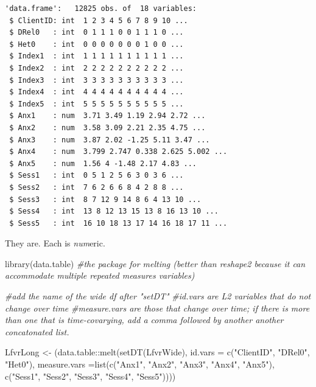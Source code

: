 \documentclass[
  11pt,
]{book}
\newenvironment{Shaded}{\begin{snugshade}}{\end{snugshade}}
\newcommand{\AttributeTok}[1]{\textcolor[rgb]{0.77,0.63,0.00}{#1}}
\newcommand{\CommentTok}[1]{\textcolor[rgb]{0.56,0.35,0.01}{\textit{#1}}}
\newcommand{\FunctionTok}[1]{\textcolor[rgb]{0.00,0.00,0.00}{#1}}
\newcommand{\NormalTok}[1]{#1}
\newcommand{\OtherTok}[1]{\textcolor[rgb]{0.56,0.35,0.01}{#1}}
\newcommand{\SpecialCharTok}[1]{\textcolor[rgb]{0.00,0.00,0.00}{#1}}
\newcommand{\StringTok}[1]{\textcolor[rgb]{0.31,0.60,0.02}{#1}}
\begin{document}
\begin{verbatim}
'data.frame':   12825 obs. of  18 variables:
 $ ClientID: int  1 2 3 4 5 6 7 8 9 10 ...
 $ DRel0   : int  0 1 1 1 0 0 1 1 1 0 ...
 $ Het0    : int  0 0 0 0 0 0 0 1 0 0 ...
 $ Index1  : int  1 1 1 1 1 1 1 1 1 1 ...
 $ Index2  : int  2 2 2 2 2 2 2 2 2 2 ...
 $ Index3  : int  3 3 3 3 3 3 3 3 3 3 ...
 $ Index4  : int  4 4 4 4 4 4 4 4 4 4 ...
 $ Index5  : int  5 5 5 5 5 5 5 5 5 5 ...
 $ Anx1    : num  3.71 3.49 1.19 2.94 2.72 ...
 $ Anx2    : num  3.58 3.09 2.21 2.35 4.75 ...
 $ Anx3    : num  3.87 2.02 -1.25 5.11 3.47 ...
 $ Anx4    : num  3.799 2.747 0.338 2.625 5.002 ...
 $ Anx5    : num  1.56 4 -1.48 2.17 4.83 ...
 $ Sess1   : int  0 5 1 2 5 6 3 0 3 6 ...
 $ Sess2   : int  7 6 2 6 6 8 4 2 8 8 ...
 $ Sess3   : int  8 7 12 9 14 8 6 4 13 10 ...
 $ Sess4   : int  13 8 12 13 15 13 8 16 13 10 ...
 $ Sess5   : int  16 10 18 13 17 14 16 18 17 11 ...
\end{verbatim}

They are. Each is \emph{num}eric.

\begin{Shaded}
\begin{Highlighting}[]
\FunctionTok{library}\NormalTok{(data.table) }\CommentTok{\#the package for melting (better than reshape2 because it can accommodate multiple repeated measures variables)}

\CommentTok{\#add the name of the wide df after "setDT"}
\CommentTok{\#id.vars are L2 variables that do not change over time}
\CommentTok{\#measure.vars are those that change over time; if there is more than one that is time{-}covarying, add a comma followed by another another concatonated list.}

\NormalTok{LfvrLong }\OtherTok{\textless{}{-}}\NormalTok{ (data.table}\SpecialCharTok{::}\FunctionTok{melt}\NormalTok{(}\FunctionTok{setDT}\NormalTok{(LfvrWide), }\AttributeTok{id.vars =} \FunctionTok{c}\NormalTok{(}\StringTok{"ClientID"}\NormalTok{, }\StringTok{"DRel0"}\NormalTok{, }\StringTok{"Het0"}\NormalTok{), }\AttributeTok{measure.vars =}\FunctionTok{list}\NormalTok{(}\FunctionTok{c}\NormalTok{(}\StringTok{"Anx1"}\NormalTok{, }\StringTok{"Anx2"}\NormalTok{, }\StringTok{"Anx3"}\NormalTok{, }\StringTok{"Anx4"}\NormalTok{, }\StringTok{"Anx5"}\NormalTok{), }\FunctionTok{c}\NormalTok{(}\StringTok{"Sess1"}\NormalTok{, }\StringTok{"Sess2"}\NormalTok{, }\StringTok{"Sess3"}\NormalTok{, }\StringTok{"Sess4"}\NormalTok{, }\StringTok{"Sess5"}\NormalTok{))))}
\end{Highlighting}
\end{Shaded}
\end{document}
